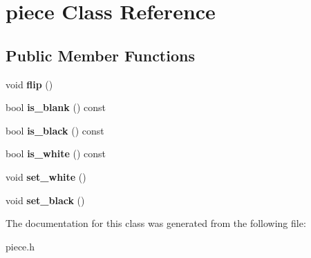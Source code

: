 \hypertarget{classpiece}{}\section{piece Class Reference}
\label{classpiece}
\subsection*{Public Member Functions}
\begin{DoxyCompactItemize}
\item 
\mbox{\label{classpiece_ab898c5827a5859e4cddc9d61a814a873}} 
void {\bfseries flip} ()
\item 
\mbox{\label{classpiece_aa1eda7729e0f3383a813fc6ccc4e7e3c}} 
bool {\bfseries is\+\_\+blank} () const
\item 
\mbox{\label{classpiece_a103dccd216cb495d1c42b2465778be53}} 
bool {\bfseries is\+\_\+black} () const
\item 
\mbox{\label{classpiece_ae9dde29687fcb2b7badc6cb5395a13f2}} 
bool {\bfseries is\+\_\+white} () const
\item 
\mbox{\label{classpiece_a31480899f2a591fdb22d97933303e19d}} 
void {\bfseries set\+\_\+white} ()
\item 
\mbox{\label{classpiece_a273d63d07b6ea973b2fc4f7e1b56ea10}} 
void {\bfseries set\+\_\+black} ()
\end{DoxyCompactItemize}


The documentation for this class was generated from the following file\+:\begin{DoxyCompactItemize}
\item 
piece.\+h\end{DoxyCompactItemize}
